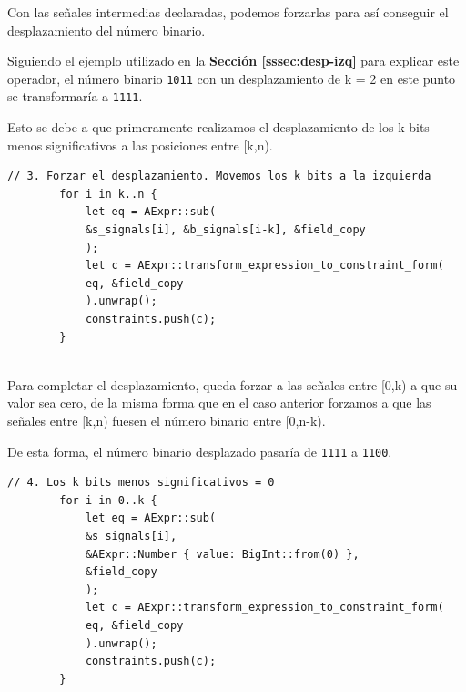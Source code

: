 \documentclass[a4paper,12pt]{report}
\begin{document}
	\vspace{0.2cm}
	\noindent Con las señales intermedias declaradas, podemos forzarlas para así conseguir el desplazamiento del número binario.
	
	\vspace{0.2cm}
	\noindent Siguiendo el ejemplo utilizado en la \hyperref[sssec:desp-izq]{\textbf{Sección \ref{sssec:desp-izq}}} para explicar este operador, el número binario \texttt{1011} con un desplazamiento de k = 2 en este punto se transformaría a \texttt{1111}. 
	
	\vspace{0.2cm}
	\noindent
	Esto se debe a que primeramente realizamos el desplazamiento de los k bits menos significativos a las posiciones entre [k,n).
	
	\vspace{0.3cm}
	\begin{lstlisting}[style=RustStyle, caption={},         basicstyle=\ttfamily\scriptsize, 
		xleftmargin=0pt
		]
		// 3. Forzar el desplazamiento. Movemos los k bits a la izquierda
		for i in k..n {
			let eq = AExpr::sub(
			&s_signals[i], &b_signals[i-k], &field_copy
			);
			let c = AExpr::transform_expression_to_constraint_form(
			eq, &field_copy
			).unwrap();
			constraints.push(c);
		}
		
	\end{lstlisting}
	
	\vspace{0.2cm}
	\noindent Para completar el desplazamiento, queda forzar a las señales entre [0,k) a que su valor sea cero, de la misma forma que en el caso anterior forzamos a que las señales entre [k,n) fuesen el número binario entre [0,n-k).
	
	\vspace{0.2cm}
	\noindent De esta forma, el número binario desplazado pasaría de \texttt{1111} a \texttt{1100}. 
	
	\vspace{0.3cm}
	\begin{lstlisting}[style=RustStyle, caption={},         basicstyle=\ttfamily\scriptsize, 
		xleftmargin=0pt
		]
		// 4. Los k bits menos significativos = 0
		for i in 0..k {
			let eq = AExpr::sub(
			&s_signals[i],
			&AExpr::Number { value: BigInt::from(0) },
			&field_copy
			);
			let c = AExpr::transform_expression_to_constraint_form(
			eq, &field_copy
			).unwrap();
			constraints.push(c);
		}
		
	\end{lstlisting}
	
\end{document}
